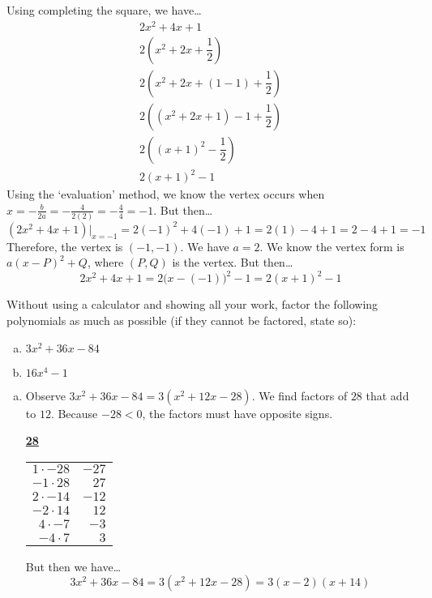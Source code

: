 \documentclass[12pt,letterpaper]{exam}
\begin{document}
\begin{questions}
\sol Using completing the square, we have\dots
	\[
	\begin{gathered}
	2x^2 + 4x + 1 \\[0.3cm]
	2 \left(x^2 + 2x + \dfrac{1}{2} \right) \\[0.3cm]
	2 \left(x^2 + 2x + (1 - 1)  + \dfrac{1}{2} \right) \\[0.3cm]
	2 \left( (x^2 + 2x + 1) - 1  + \dfrac{1}{2} \right) \\[0.3cm]
	2 \left( (x + 1)^2 - \dfrac{1}{2} \right) \\[0.3cm]
	2(x + 1)^2 - 1
	\end{gathered}
	\] \pspace
Using the `evaluation' method, we know the vertex occurs when $x= -\frac{b}{2a}= -\frac{4}{2(2)}= -\frac{4}{4}= -1$. But then\dots
	\[
	\left(2x^2 + 4x + 1\right) \bigg|_{x= -1}= 2(-1)^2 + 4(-1) + 1= 2(1) - 4 + 1= 2 - 4 + 1= -1
	\]
Therefore, the vertex is $(-1, -1)$. We have $a= 2$. We know the vertex form is $a(x - P)^2 + Q$, where $(P, Q)$ is the vertex. But then\dots
	\[
	2x^2 + 4x + 1= 2 \big(x - (-1) \big)^2 - 1= 2(x + 1)^2 - 1
	\]



\newpage
\question[10] Without using a calculator and showing all your work, factor the following polynomials as much as possible (if they cannot be factored, state so):
	\begin{enumerate}[(a)]
	\item $3x^2 + 36x - 84$
	\item $16x^4 - 1$
	\end{enumerate} \pspace

\sol 
\begin{enumerate}[(a)]
\item Observe $3x^2 + 36x - 84= 3(x^2 + 12x - 28)$. We find factors of $28$ that add to $12$. Because $-28 < 0$, the factors must have opposite signs. 
	\begin{table}[!ht]
	\centering
	\underline{\bfseries 28} \pvspace{0.2cm}
	\begin{tabular}{rr}
	$1 \cdot -28$ & $-27$ \\ 
	$-1 \cdot 28$ & $27$ \\
	$2 \cdot -14$ & $-12$ \\ \hline
	\multicolumn{1}{|r}{$-2 \cdot 14$} & \multicolumn{1}{r|}{$12$} \\ \hline
	$4 \cdot -7$ & $-3$ \\
	$-4 \cdot 7$ & $3$
	\end{tabular}
	\end{table}
But then we have\dots
	\[
	3x^2 + 36x - 84= 3(x^2 + 12x - 28)= 3(x - 2)(x + 14)
	\] \pspace


\end{enumerate}
\end{questions}
\end{document}
